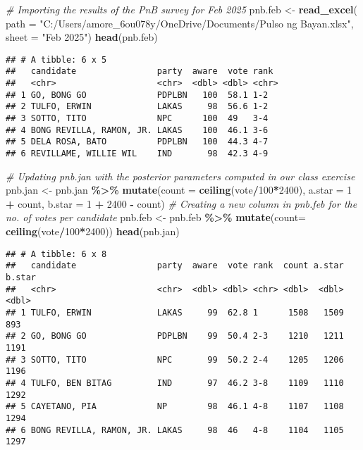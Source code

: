 \documentclass[]{article}
\newenvironment{Shaded}{\begin{snugshade}}{\end{snugshade}}
\newcommand{\AttributeTok}[1]{\textcolor[rgb]{0.13,0.29,0.53}{#1}}
\newcommand{\CommentTok}[1]{\textcolor[rgb]{0.56,0.35,0.01}{\textit{#1}}}
\newcommand{\DecValTok}[1]{\textcolor[rgb]{0.00,0.00,0.81}{#1}}
\newcommand{\FunctionTok}[1]{\textcolor[rgb]{0.13,0.29,0.53}{\textbf{#1}}}
\newcommand{\NormalTok}[1]{#1}
\newcommand{\OtherTok}[1]{\textcolor[rgb]{0.56,0.35,0.01}{#1}}
\newcommand{\SpecialCharTok}[1]{\textcolor[rgb]{0.81,0.36,0.00}{\textbf{#1}}}
\newcommand{\StringTok}[1]{\textcolor[rgb]{0.31,0.60,0.02}{#1}}
\begin{document}
\begin{Shaded}
\begin{Highlighting}[]
\CommentTok{\# Importing the results of the PnB survey for Feb 2025}
\NormalTok{pnb.feb }\OtherTok{\textless{}{-}} \FunctionTok{read\_excel}\NormalTok{(}
    \AttributeTok{path =} \StringTok{"C:/Users/amore\_6ou078y/OneDrive/Documents/Pulso ng Bayan.xlsx"}\NormalTok{, }
    \AttributeTok{sheet =} \StringTok{"Feb 2025"}\NormalTok{)}
\FunctionTok{head}\NormalTok{(pnb.feb)}
\end{Highlighting}
\end{Shaded}

\begin{verbatim}
## # A tibble: 6 x 5
##   candidate                party  aware  vote rank 
##   <chr>                    <chr>  <dbl> <dbl> <chr>
## 1 GO, BONG GO              PDPLBN   100  58.1 1-2  
## 2 TULFO, ERWIN             LAKAS     98  56.6 1-2  
## 3 SOTTO, TITO              NPC      100  49   3-4  
## 4 BONG REVILLA, RAMON, JR. LAKAS    100  46.1 3-6  
## 5 DELA ROSA, BATO          PDPLBN   100  44.3 4-7  
## 6 REVILLAME, WILLIE WIL    IND       98  42.3 4-9
\end{verbatim}

\begin{Shaded}
\begin{Highlighting}[]
\CommentTok{\# Updating pnb.jan with the posterior parameters computed in our class exercise}
\NormalTok{pnb.jan }\OtherTok{\textless{}{-}}\NormalTok{ pnb.jan }\SpecialCharTok{\%\textgreater{}\%}
  \FunctionTok{mutate}\NormalTok{(}\AttributeTok{count =} \FunctionTok{ceiling}\NormalTok{(vote}\SpecialCharTok{/}\DecValTok{100}\SpecialCharTok{*}\DecValTok{2400}\NormalTok{),}
         \AttributeTok{a.star =} \DecValTok{1} \SpecialCharTok{+}\NormalTok{ count,}
         \AttributeTok{b.star =} \DecValTok{1} \SpecialCharTok{+} \DecValTok{2400} \SpecialCharTok{{-}}\NormalTok{ count)}
\CommentTok{\# Creating a new column in pnb.feb for the no. of votes per candidate}
\NormalTok{pnb.feb }\OtherTok{\textless{}{-}}\NormalTok{ pnb.feb }\SpecialCharTok{\%\textgreater{}\%}
  \FunctionTok{mutate}\NormalTok{(}\AttributeTok{count=} \FunctionTok{ceiling}\NormalTok{(vote}\SpecialCharTok{/}\DecValTok{100}\SpecialCharTok{*}\DecValTok{2400}\NormalTok{))}
\FunctionTok{head}\NormalTok{(pnb.jan)}
\end{Highlighting}
\end{Shaded}

\begin{verbatim}
## # A tibble: 6 x 8
##   candidate                party  aware  vote rank  count a.star b.star
##   <chr>                    <chr>  <dbl> <dbl> <chr> <dbl>  <dbl>  <dbl>
## 1 TULFO, ERWIN             LAKAS     99  62.8 1      1508   1509    893
## 2 GO, BONG GO              PDPLBN    99  50.4 2-3    1210   1211   1191
## 3 SOTTO, TITO              NPC       99  50.2 2-4    1205   1206   1196
## 4 TULFO, BEN BITAG         IND       97  46.2 3-8    1109   1110   1292
## 5 CAYETANO, PIA            NP        98  46.1 4-8    1107   1108   1294
## 6 BONG REVILLA, RAMON, JR. LAKAS     98  46   4-8    1104   1105   1297
\end{verbatim}
\end{document}
